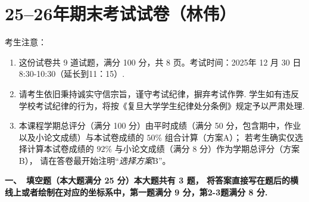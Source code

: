 
\section{25--26年期末考试试卷（林伟）}

考生注意：
\begin{enumerate}
\item 这份试卷共 9 道试题，满分 100 分，共 8 页。考试时间：2025年 12 月 30 日 8:30-10:30（延长到11：15）.
\item 请考生依旧秉持诚实守信宗旨，谨守考试纪律，摒弃考试作弊.
学生如有违反学校考试纪律的行为，将按《复旦大学学生纪律处分条例》规定予以严肃处理.
\item 本课程学期总评分（满分 100 分）由平时成绩（满分 50 分，包含期中，作业以及小论文成绩）与本试卷成绩的 $50 \%$ 组合计算（方案A）；
若考生确实仅选择计算本试卷成绩的 $92 \%$ 与小论文成绩（满分 8 分）作为学期总评分（方案B），
请在答卷最开始注明``\textit{选择方案}B''。
\end{enumerate}
\textbf{一、\ 填空题（本大题满分 25 分）本大题共有 3 题，
将答案直接写在题后的横线上或者绘制在对应的坐标系中，第一题满分 9 分，第2-3题满分 8 分.}

